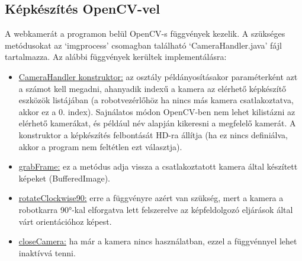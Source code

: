 \documentclass[../documentation.tex]{subfiles}
\begin{document}
\subsection{Képkészítés OpenCV-vel}
A webkamerát a programon belül OpenCV-s függvények kezelik. A szükséges metódusokat az `imgprocess' csomagban található `CameraHandler.java' fájl tartalmazza. Az alábbi függvények kerültek implementálásra:
\begin{itemize}
	\item \underline{CameraHandler konstruktor:} az osztály példányosításakor paraméterként azt a számot kell megadni, ahanyadik indexű a kamera az elérhető képkészítő eszközök listájában (a robotvezérlőhöz ha nincs más kamera csatlakoztatva, akkor ez a 0. index). Sajnálatos módon OpenCV-ben nem lehet kilistázni az elérhető kamerákat, és például név alapján kikeresni a megfelelő kamerát. A konstruktor a képkészítés felbontását HD-ra állítja (ha ez nincs definiálva, akkor a program nem feltétlen ezt választja).
	\item \underline{grabFrame:} ez a metódus adja vissza a csatlakoztatott kamera által készített képeket (BufferedImage).
	\item \underline{rotateClockwise90:} erre a függvényre azért van szükség, mert a kamera a robotkarra 90°-kal elforgatva lett felszerelve az képfeldolgozó eljárások által várt orientációhoz képest.
	\item \underline{closeCamera:} ha már a kamera nincs használatban, ezzel a függvénnyel lehet inaktívvá tenni.
\end{itemize}
\end{document}
